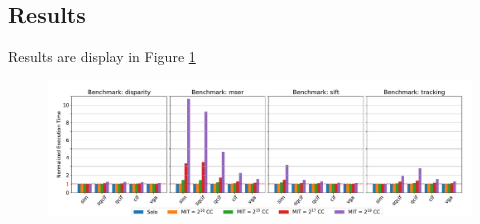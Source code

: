     \subsection{Results}
    Results are display in Figure \ref{fig:cup-brainfreeze-interference-results}
        \begin{figure}
            \centering
            \includegraphics[scale=0.425]{images/cpu-brainfreeze-interference.pdf}
            \caption{}
            \label{fig:cup-brainfreeze-interference-results}
        \end{figure}
